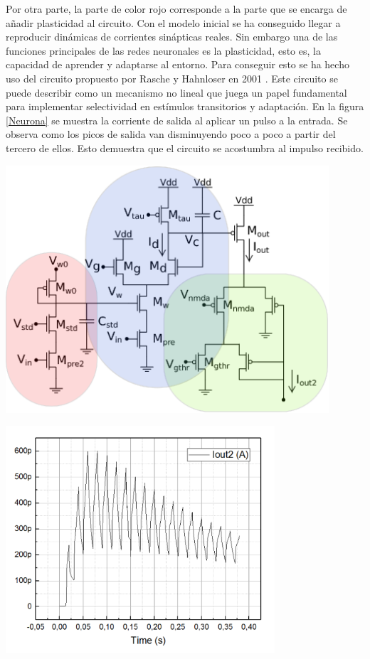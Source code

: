 Por otra parte, la parte de color rojo corresponde a la parte que se encarga de añadir plasticidad al circuito. Con el modelo inicial se ha conseguido llegar a reproducir dinámicas de corrientes sinápticas reales. Sin embargo una de las funciones principales de las redes neuronales es la plasticidad, esto es, la capacidad de aprender y adaptarse al entorno. Para conseguir esto se ha hecho uso del circuito propuesto por Rasche y Hahnloser en 2001 \cite{rasche2001silicon}. Este circuito se puede describir como un mecanismo no lineal que juega un papel fundamental para implementar selectividad en estímulos transitorios y adaptación. En la figura \ref{Neurona} se muestra la corriente de salida al aplicar un pulso a la entrada. Se observa como los picos de salida van disminuyendo poco a poco a partir del tercero de ellos. Esto demuestra que el circuito se acostumbra al impulso recibido.

	\begin{center}
		\includegraphics[width=12cm]{Imagenes/Sinaptico/Final_2.eps}
    		\label{Final}
	\end{center}	
	
		\begin{center}
		\includegraphics[width=10cm]{Imagenes/Sinaptico/Neurona}
    		\label{Neurona}
	\end{center}	
	
	



